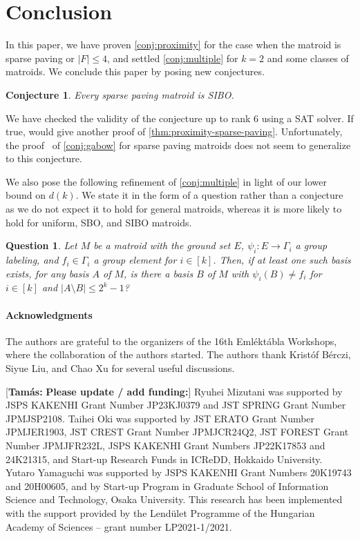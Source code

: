 \documentclass{article}
\newtheorem{conjecture}[theorem]{Conjecture}
\newtheorem{question}[theorem]{Question}
\theoremstyle{definition}
\newcommand{\snote}[1]{{\color{cyan}[{\tiny \textbf{Tamás:} \bf #1}]\marginpar{\color{cyan}*}}}
\newcommand{\snote}[1]{}
\begin{document}
\section{Conclusion}\label{sec:conclusion}

In this paper, we have proven \cref{conj:proximity} for the case when the matroid is sparse paving or $|F| \le 4$, and settled \cref{conj:multiple} for $k = 2$ and some classes of matroids.
We conclude this paper by posing new conjectures.

\begin{conjecture}\label{conj:sparse-paving-is-sibo}
    Every sparse paving matroid is SIBO.
\end{conjecture}

We have checked the validity of the conjecture up to rank 6 using a SAT solver.
If true,  would give another proof of \cref{thm:proximity-sparse-paving}.
Unfortunately, the proof~\cite{bonin2013basis} of \cref{conj:gabow} for sparse paving matroids does not seem to generalize to this conjecture. 



We also pose the following refinement of \cref{conj:multiple} in light of our lower bound on $d(k)$.
We state it in the form of a question rather than a conjecture as we do not expect it to hold for general matroids, whereas it is more likely to hold for uniform, SBO, and SIBO matroids.

\begin{question}\label{conj:quantative-multiple}
    Let $M$ be a matroid with the ground set $E$, $\psi_i \colon E \to \Gamma_i$ a group labeling, and $f_i \in \Gamma_i$ a group element for $i \in [k]$.
    Then, if at least one such basis exists, for any basis $A$ of $M$, is there a basis $B$ of $M$ with $\psi_i(B) \ne f_i$ for $i \in [k]$ and $|A\setminus B| \le 2^k - 1$? 
\end{question}

\paragraph{Acknowledgments}
The authors are grateful to the organizers of the 16th Emléktábla Workshops, where the collaboration of the authors started.
The authors thank Kristóf Bérczi, Siyue Liu, and Chao Xu for several useful discussions.

\snote{Please update / add funding:} 
Ryuhei Mizutani was supported by JSPS KAKENHI Grant Number JP23KJ0379 and JST SPRING Grant Number JPMJSP2108.
Taihei Oki was supported by JST ERATO Grant Number JPMJER1903, JST CREST Grant Number JPMJCR24Q2, JST FOREST Grant Number JPMJFR232L, JSPS KAKENHI Grant Numbers JP22K17853 and 24K21315, and Start-up Research Funds in ICReDD, Hokkaido University.
Yutaro Yamaguchi was supported by JSPS KAKENHI Grant Numbers 20K19743 and 20H00605, and by Start-up Program in Graduate School of Information Science and Technology, Osaka University.
This research has been implemented with the support provided by the Lend\"ulet Programme of the Hungarian Academy of Sciences -- grant number LP2021-1/2021.
\end{document}

